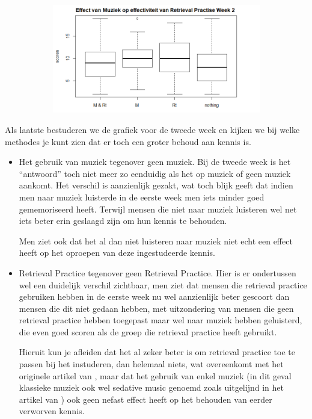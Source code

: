 \documentclass{hogent-article}
\begin{document}
\begin{figure}[H]
	\begin{subfigure}{0.50\textwidth}
		\includegraphics[width=\linewidth]{muziekGraph2}
	\end{subfigure}
\end{figure}

Als laatste bestuderen we de grafiek voor de tweede week en kijken we bij welke methodes je kunt zien dat er toch een groter behoud aan kennis is.


\begin{itemize}
    \item Het gebruik van muziek tegenover geen muziek. Bij de tweede week is het “antwoord” toch niet meer zo eenduidig als het op muziek of geen muziek aankomt. Het verschil is aanzienlijk gezakt, wat toch blijk geeft dat indien men naar muziek luisterde in de eerste week men iets minder goed gememoriseerd heeft. Terwijl mensen die niet naar muziek luisteren wel net iets beter erin geslaagd zijn om hun kennis te behouden.
    \\
    \par
    \noindent
    Men ziet ook dat het al dan niet luisteren naar muziek niet echt een effect heeft op het oproepen van deze ingestudeerde kennis.
    \\
    \item Retrieval Practice tegenover geen Retrieval Practice. Hier is er ondertussen wel een duidelijk verschil zichtbaar, men ziet dat mensen die retrieval practice gebruiken hebben in de eerste week nu wel aanzienlijk beter gescoort dan mensen die dit niet gedaan hebben, met uitzondering van mensen die geen retrieval practice hebben toegepast maar wel naar muziek hebben geluisterd, die even goed scoren als de groep die retrieval practice heeft gebruikt. \\
    \par
    \noindent
    Hieruit kun je afleiden dat het al zeker beter is om retrieval practice toe te passen bij het instuderen, dan helemaal niets, wat overeenkomt met het originele artikel van \textcite{Roediger2006}, maar dat het gebruik van enkel muziek (in dit geval klassieke muziek ook wel sedative music genoemd zoals uitgelijnd in het artikel van \textcite{Dolegui2013}) ook geen nefast effect heeft op het behouden van eerder verworven kennis.
    
\end{itemize}
    
\end{document}
